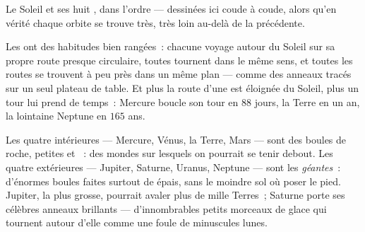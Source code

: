 \begin{omfigure}

{\small Le Soleil et ses huit , dans l'ordre --- dessinées
ici coude à coude, alors qu'en vérité chaque orbite se trouve
très, très loin au-delà de la précédente.}
\end{omfigure}

\begin{proposition}\label{prop:g4:solar-system:habits}
Les  ont des habitudes bien rangées~: chacune voyage autour
du Soleil sur sa propre route presque circulaire, toutes tournent
dans le même sens, et toutes les routes se trouvent à peu près dans
un même plan --- comme des anneaux tracés sur un seul plateau de
table. Et plus la route d'une  est éloignée du Soleil, plus un
tour lui prend de temps~: Mercure boucle son tour en $88$ jours, la
Terre en un an, la lointaine Neptune en $165$ ans.
\end{proposition}

\begin{example}\label{ex:g4:solar-system:kinds}
Les quatre  intérieures --- Mercure, Vénus, la Terre, Mars
--- sont des boules de roche, petites et ~: des mondes sur
lesquels on pourrait se tenir debout. Les quatre extérieures ---
Jupiter, Saturne, Uranus, Neptune --- sont les \emph{géantes}~:
d'énormes boules faites surtout de  épais, sans le moindre sol où
poser le pied. Jupiter, la plus grosse, pourrait avaler plus de mille
Terres~; Saturne porte ses célèbres anneaux brillants --- d'innombrables
petits morceaux de glace qui tournent autour d'elle comme une foule
de minuscules lunes.
\end{example}

